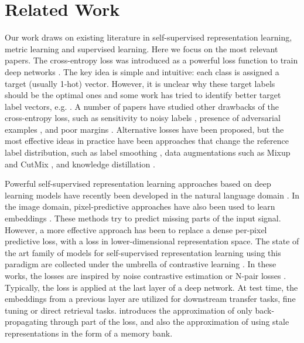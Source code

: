\section{Related Work}
\label{sec:related}
Our work draws on existing literature in self-supervised representation learning, metric learning and supervised learning. Here we focus on the most relevant papers. The cross-entropy loss was introduced as a powerful loss function to train deep networks \cite{rumelhart1986learning,baum1988supervised,levin1988accelerated}. The key idea is simple and intuitive: each class is assigned a target (usually 1-hot) vector. However, it is unclear why these target labels should be the optimal ones and some work has tried to identify better target label vectors, e.g. \cite{yang2015deep}. A number of papers have studied other drawbacks of the cross-entropy loss, such as sensitivity to noisy labels \cite{zhang2018generalized,sukhbaatar2014training}, presence of adversarial examples \cite{elsayed2018large,nar2019cross}, and poor margins \cite{cao2019learning}. Alternative losses have been proposed, but the most effective ideas in practice have been approaches that change the reference label distribution, such as label smoothing \cite{szegedy2016rethinking,muller2019does}, data augmentations such as Mixup \cite{zhang2017mixup} and CutMix \cite{yun2019cutmix}, and knowledge distillation \cite{hinton2015distilling}.

Powerful self-supervised representation learning approaches based on deep learning models have recently been developed in the natural language domain \cite{devlin2018bert,yang2019xlnet,mikolov2013distributed}. In the image domain, pixel-predictive approaches have also been used to learn embeddings \cite{doersch2015unsupervised,zhang2016colorful,zhang2017split,noroozi2016unsupervised}. These methods try to predict missing parts of the input signal. However, a more effective approach has been to replace a dense per-pixel predictive loss, with a loss in lower-dimensional representation space. The state of the art family of models for self-supervised representation learning using this paradigm are collected under the umbrella of contrastive learning \cite{wu2018unsupervised,henaff2019data,hjelm2018learning,tian2019contrastive,sermanet2017time,chen2020simple,tschannen2019mutual}. In these works, the losses are inspired by noise contrastive estimation \cite{gutmann2010noise,mnih2013learning} or N-pair losses \cite{sohn2016improved}. Typically, the loss is applied at the last layer of a deep network. At test time, the embeddings from a previous layer are utilized for downstream transfer tasks, fine tuning or direct retrieval tasks. \cite{he2019momentum} introduces the approximation of only back-propagating through part of the loss, and also the approximation of using stale representations in the form of a memory bank.

